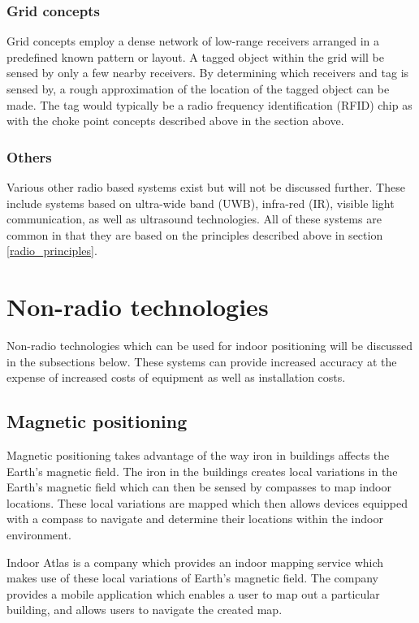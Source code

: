 \documentclass[11pt,a4paper]{report}
\begin{document}
		\subsubsection{Grid concepts}
			Grid concepts employ a dense network of low-range receivers arranged in a predefined known pattern or layout. A tagged object within the grid will be sensed by only a few nearby receivers. By determining which receivers and tag is sensed by, a rough approximation of the location of the tagged object can be made. The tag would typically be a radio frequency identification (RFID) chip as with the choke point concepts described above in the section above.
		
		\subsubsection{Others}
			Various other radio based systems exist but will not be discussed further. These include systems based on ultra-wide band (UWB), infra-red (IR), visible light communication, as well as ultrasound technologies. All of these systems are common in that they are based on the principles described above in section \ref{radio_principles}.
	
	\section{Non-radio technologies}
		Non-radio technologies which can be used for indoor positioning will be discussed in the subsections below. These systems can provide increased accuracy at the expense of increased costs of equipment as well as installation costs.
	
	\subsection{Magnetic positioning}
		Magnetic positioning takes advantage of the way iron in buildings affects the Earth's magnetic field. The iron in the buildings creates local variations in the Earth's magnetic field which can then be sensed by compasses to map indoor locations. These local variations are mapped which then allows devices equipped with a compass to navigate and determine their locations within the indoor environment.
		\cite{supreeth_sudhakaran_geospatial_2014}
		
		Indoor Atlas is a company which provides an indoor mapping service which makes use of these local variations of Earth's magnetic field. The company provides a mobile application which enables a user to map out a particular building, and allows users to navigate the created map.
	
\end{document}
